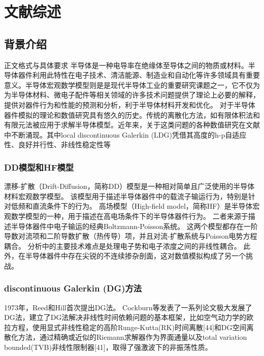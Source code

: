 \cleardoublepage
\newrefsection
\chapter{文献综述}

\section{背景介绍}
\par 正文格式与具体要求\cite{zjuthesisrules}
半导体是一种电导率在绝缘体至导体之间的物质或材料。半导体器件利用此特性在电子技术、清洁能源、制造业和自动化等许多领域具有重要意义。半导体宏观数学模型则是是现代半导体工业的重要研究课题之一，它不仅为为半导体材料、微电子配件等相关领域的许多技术问题提供了理论上必要的解释，提供对器件行为和性能的预测和分析，利于半导体材料开发和优化。
对于半导体器件模拟的理论和数值研究具有悠久的历史。传统的离散化方法，如有限体积法\cite{bank1983numerical,bank1998finite,chainais2003finite,bessemoulin2012finite}和有限元法\cite{brezzi1989two,mauri20153d}被应用于求解半导体模型。近年来，关于这类问题的各种数值研究在文献中不断涌现。其中local discontinuous Galerkin (LDG)凭借其高度的h-p自适应性、良好并行性、非线性稳定性等
\subsection{DD模型\cite{cercignani2000device}和HF模型\cite{cercignani2000device}}
漂移-扩散（Drift-Diffusion，简称DD）模型是一种相对简单且广泛使用的半导体材料宏观数学模型。
该模型用于描述半导体器件中的载流子输运行为，特别是针对低频和直流条件下的行为。
高场模型（High-field model，简称HF）是半导体宏观数学模型的一种，用于描述在高电场条件下的半导体器件行为。
二者来源于描述半导体器件中电子输运的经典Boltzmann-Poisson系统。
这两个模型都存在一阶导数对流项和二阶导数扩散（热传导）项，并且对流-扩散系统与Poisson电势方程耦合\cite{cercignani2000device}。
分析中的主要技术难点是处理电子势和电子浓度之间的非线性耦合。
此外，在半导体器件中存在尖锐的不连续掺杂剖面，这对数值模拟构成了另一个挑战。

\subsection{discontinuous Galerkin (DG)方法}
1973年，Reed和Hill首次提出DG法\cite{reed1973triangular}。
Cockburn等发表了一系列论文极大发展了DG法，建立了DG法解决非线性时间依赖问题的基本框架\cite{reed1973triangular,cockburn1991runge,cockburn1989tvb2,cockburn1989tvb3,cockburn1990runge,cockburn1998runge}，比如空气动力学的欧拉方程，使用显式非线性稳定的高阶Runge-Kutta(RK)时间离散[44]和DG空间离散化方法，通过精确或近似的Riemann求解器作为界面通量以及total variation bounded(TVB)非线性限制器[41]，取得了强激波下的非振荡性质。

